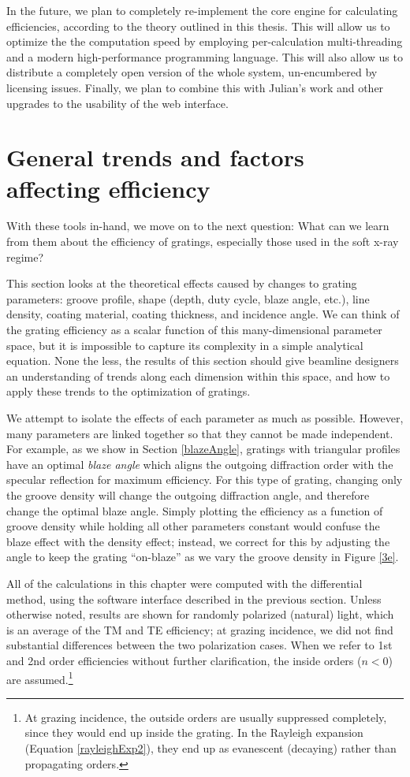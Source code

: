 In the future, we plan to completely re-implement the core engine for calculating efficiencies, according to the theory outlined in this thesis.  This will allow us to optimize the the computation speed by employing per-calculation multi-threading and a modern high-performance programming language.  This will also allow us to distribute a completely open version of the whole system, un-encumbered by licensing issues.  Finally, we plan to combine this with Julian's work and other upgrades to the usability of the web interface.

\section{General trends and factors affecting efficiency}
With these tools in-hand, we move on to the next question: What can we learn from them about the efficiency of gratings, especially those used in the soft x-ray regime?

This section looks at the theoretical effects caused by changes to grating parameters: groove profile, shape (depth, duty cycle, blaze angle, etc.), line density, coating material, coating thickness, and incidence angle.  We can think of the grating efficiency as a scalar function of this many-dimensional parameter space, but it is impossible to capture its complexity in a simple analytical equation.  None the less, the results of this section should give beamline designers an understanding of trends along each dimension within this space, and how to apply these trends to the optimization of gratings.

We attempt to isolate the effects of each parameter as much as possible.  However, many parameters are linked together so that they cannot be made independent.  For example, as we show in Section \ref{blazeAngle}, gratings with triangular profiles have an optimal \emph{blaze angle} which aligns the outgoing diffraction order with the specular reflection for maximum efficiency.  For this type of grating, changing only the groove density will change the outgoing diffraction angle, and therefore change the optimal blaze angle.  Simply plotting the efficiency as a function of groove density while holding all other parameters constant would confuse the blaze effect with the density effect; instead, we correct for this by adjusting the angle to keep the grating ``on-blaze'' as we vary the groove density in Figure \ref{3e}.

All of the calculations in this chapter were computed with the differential method, using the software interface described in the previous section.  Unless otherwise noted, results are shown for randomly polarized (natural) light, which is an average of the TM and TE efficiency; at grazing incidence, we did not find substantial differences between the two polarization cases.  When we refer to 1st and 2nd order efficiencies without further clarification, the inside orders ($n<0$) are assumed.\footnote{At grazing incidence, the outside orders are usually suppressed completely, since they would end up inside the grating. In the Rayleigh expansion (Equation \ref{rayleighExp2}), they end up as evanescent (decaying) rather than propagating orders.}
